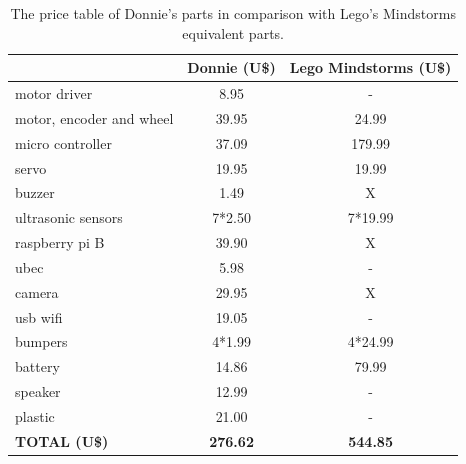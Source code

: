 \begin{table}[ht!]
\centering
\caption{The price table of Donnie's parts in comparison with Lego's Mindstorms equivalent parts.}
\label{tab:cost-table}
\begin{tabular}{|l|c|c|}
\hline
 & Donnie (U\$)    & Lego Mindstorms (U\$)  \\ \hline
motor driver             & 8.95    & -      \\ \hline
motor, encoder and wheel & 39.95   & 24.99  \\ \hline
micro controller         & 37.09   & 179.99 \\ \hline
servo                    & 19.95   & 19.99  \\ \hline
buzzer                   & 1.49    & X      \\ \hline
ultrasonic sensors       & 7*2.50  & 7*19.99\\ \hline
raspberry pi B           & 39.90   & X      \\ \hline
ubec                     & 5.98    & -      \\ \hline
camera                   & 29.95   & X      \\ \hline
usb wifi                 & 19.05   & -      \\ \hline
bumpers                  & 4*1.99  & 4*24.99\\ \hline
battery                  & 14.86   & 79.99  \\ \hline
speaker                  & 12.99   & -      \\ \hline
plastic                  & 21.00   & -      \\ \hline
\textbf{TOTAL (U\$)}     & \textbf{276.62} & \textbf{544.85}           \\ \hline
\end{tabular}
\end{table}

